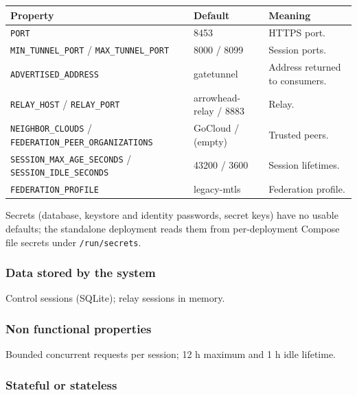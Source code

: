 \documentclass[a4paper]{arrowhead}
\begin{document}
\noindent\begin{longtable}{| p{5.4cm} | p{3.4cm} | p{6.4cm} |} \hline
\rowcolor{gray!33} Property & Default & Meaning \\ \hline \endhead
\texttt{PORT} & 8453 & HTTPS port. \\ \hline
\texttt{MIN\_\allowbreak{}TUNNEL\_\allowbreak{}PORT} / \texttt{MAX\_\allowbreak{}TUNNEL\_\allowbreak{}PORT} & 8000 / 8099 & Session ports. \\ \hline
\texttt{ADVERTISED\_\allowbreak{}ADDRESS} & gatetunnel & Address returned to consumers. \\ \hline
\texttt{RELAY\_\allowbreak{}HOST} / \texttt{RELAY\_\allowbreak{}PORT} & arrowhead-relay / 8883 & Relay. \\ \hline
\texttt{NEIGHBOR\_\allowbreak{}CLOUDS} / \texttt{FEDERATION\_\allowbreak{}PEER\_\allowbreak{}ORGANIZATIONS} & GoCloud / (empty) & Trusted peers. \\ \hline
\texttt{SESSION\_\allowbreak{}MAX\_\allowbreak{}AGE\_\allowbreak{}SECONDS} / \texttt{SESSION\_\allowbreak{}IDLE\_\allowbreak{}SECONDS} & 43200 / 3600 & Session lifetimes. \\ \hline
\texttt{FEDERATION\_\allowbreak{}PROFILE} & legacy-mtls & Federation profile. \\ \hline
\end{longtable}

Secrets (database, keystore and identity passwords, secret keys) have no usable defaults; the standalone deployment reads them from per-deployment Compose file secrets under \texttt{/\allowbreak{}run/\allowbreak{}secrets}.

\subsubsection{Data stored by the system}

Control sessions (SQLite); relay sessions in memory.

\subsubsection{Non functional properties}

Bounded concurrent requests per session; 12 h maximum and 1 h idle lifetime.

\subsubsection{Stateful or stateless}
\end{document}
